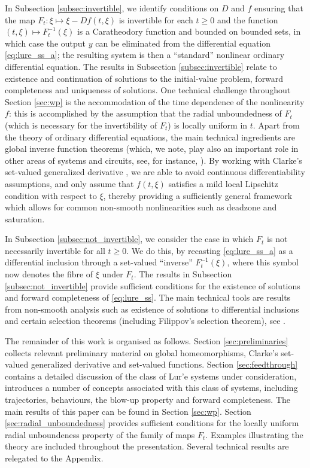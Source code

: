\documentclass[a4paper,11pt]{article}
\numberwithin{equation}{section}
\numberwithin{figure}{section}
\numberwithin{table}{section}
\begin{document}
In Subsection \ref{subsec:invertible},
we identify conditions on $D$ and $f$ ensuring that the map $F_t: \xi\mapsto \xi-Df(t,\xi)$ is
invertible for each $t\geq 0$ and the function $(t,\xi)\mapsto F_t^{-1}(\xi)$ is a Caratheodory
function and bounded on bounded sets, in which case the output $y$ can be eliminated from the
differential equation \eqref{eq:lure_ss_a}; the resulting system is then a ``standard'' nonlinear ordinary differential equation. The results in Subsection \ref{subsec:invertible} relate to existence and continuation of solutions
to the initial-value problem, forward completeness and uniqueness of solutions.  One technical challenge throughout Section \ref{sec:wp} is the accommodation of the time dependence of the nonlinearity $f$: this
is accomplished by the assumption that the radial unboundedness of $F_t$ (which is necessary
for the invertibility of $F_t$) is locally uniform in $t$. Apart from the theory of ordinary differential
equations, the main technical ingredients are global inverse function theorems (which, we note, play also an important role in other areas of systems and circuits, see, for instance, \cite{bl07,s80,s02,wd72}). By working with Clarke's set-valued generalized derivative \cite{c90,clsw98}, we are able to avoid continuous differentiability assumptions, and only assume that $f(t,\xi)$ satisfies a mild local Lipschitz condition with respect to $\xi$, thereby
providing a sufficiently general framework which allows for common non-smooth nonlinearities such as deadzone and saturation.

In Subsection \ref{subsec:not_invertible}, we consider the case in which $F_t$ is not necessarily invertible
for all $t\geq 0$. We do this, by recasting \eqref{eq:lure_ss_a} as a differential inclusion through a set-valued ``inverse'' $F_t^{-1}(\xi)$, where this symbol now denotes the fibre
of $\xi$ under $F_t$.  The results in Subsection \ref{subsec:not_invertible} provide sufficient conditions for the existence of solutions and forward completeness of \eqref{eq:lure_ss}. The main technical tools are results from non-smooth analysis such as existence of solutions to
differential inclusions and certain selection theorems (including Filippov's selection theorem),
see \cite{af09,clsw98,d92,v00,v04}.

The remainder of this work is organised as follows. Section \ref{sec:preliminaries} collects relevant preliminary material on global homeomorphisms, Clarke's
set-valued generalized derivative and set-valued functions. Section \ref{sec:feedthrough} contains
a detailed discussion of the class of Lur'e systems under consideration, introduces a number
of concepts associated with this class of systems, including trajectories, behaviours,
the blow-up property and forward completeness. The  main results of this paper can be found in Section \ref{sec:wp}. Section \ref{sec:radial_unboundedness} provides sufficient conditions for the locally uniform radial unboundeness property of the family of maps $F_t$. Examples illustrating the theory are included throughout the presentation. Several technical results are relegated to the Appendix.
%
\end{document}
